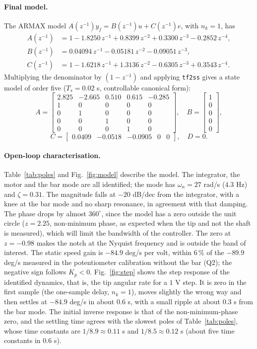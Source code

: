 \documentclass[a4paper,11pt]{article}
\begin{document}
\paragraph{Final model.}
The ARMAX model $A(z^{-1})y_f=B(z^{-1})u+C(z^{-1})e$, with $n_k=1$, has
\begin{align*}
A(z^{-1}) &= 1-1.8250\,z^{-1}+0.8399\,z^{-2}+0.3300\,z^{-3}-0.2852\,z^{-4},\\
B(z^{-1}) &= 0.04094\,z^{-1}-0.05181\,z^{-2}-0.09051\,z^{-3},\\
C(z^{-1}) &= 1-1.6218\,z^{-1}+1.3136\,z^{-2}-0.6305\,z^{-3}+0.3543\,z^{-4}.
\end{align*}
Multiplying the denominator by $(1-z^{-1})$ and applying \texttt{tf2ss} gives a state model of order five ($T_s=0.02$ s, controllable canonical form):
$$A=\begin{bmatrix} 2.825 & -2.665 & 0.510 & 0.615 & -0.285\\ 1&0&0&0&0\\ 0&1&0&0&0\\ 0&0&1&0&0\\ 0&0&0&1&0\end{bmatrix},\quad
B=\begin{bmatrix}1\\0\\0\\0\\0\end{bmatrix},$$
$$C=\begin{bmatrix}0.0409 & -0.0518 & -0.0905 & 0 & 0\end{bmatrix},\quad D=0.$$

\paragraph{Open-loop characterisation.}
Table~\ref{tab:poles} and Fig.~\ref{fig:model} describe the model.
The integrator, the motor and the bar mode are all identified; the mode has $\omega_n=27$ rad/s ($4.3$ Hz) and $\zeta=0.31$.
The magnitude falls at $-20$ dB/dec from the integrator, with a knee at the bar mode and no sharp resonance, in agreement with that damping.
The phase drops by almost $360^\circ$, since the model has a zero outside the unit circle ($z=2.25$, non-minimum phase, as expected when the tip and not the shaft is measured), which will limit the bandwidth of the controller.
The zero at $z=-0.98$ makes the notch at the Nyquist frequency and is outside the band of interest.
The static speed gain is $-84.9$ deg/s per volt, within $6\,\%$ of the $-89.9$ deg/s measured in the potentiometer calibration without the bar (Q2); the negative sign follows $K_p<0$.
Fig.~\ref{fig:step} shows the step response of the identified dynamics, that is, the tip angular rate for a $1$ V step.
It is zero in the first sample (the one-sample delay, $n_k=1$), moves slightly the wrong way and then settles at $-84.9$ deg/s in about $0.6$ s, with a small ripple at about $0.3$ s from the bar mode.
The initial inverse response is that of the non-minimum-phase zero, and the settling time agrees with the slowest poles of Table~\ref{tab:poles}, whose time constants are $1/8.9\approx0.11$ s and $1/8.5\approx0.12$ s (about five time constants in $0.6$ s).
\end{document}
